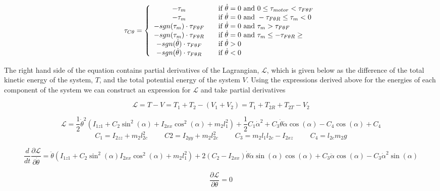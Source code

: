 \documentclass{article}
\theoremstyle{plain}
\theoremstyle{definition}
\theoremstyle{remark}
\newcommand{\Lagr}{\mathcal{L}}
\begin{document}
\[
  \tau_{C \theta} = \left\{
  \begin{array}{c l}
	 - \tau_{m} & \quad \text{if } \dot{\theta} = 0 \text{ and } 0 \leq \tau_{motor} < \tau_{F \theta F} \\
	- \tau_{m} & \quad \text{if } \dot{\theta} = 0 \text{ and } -\tau_{F \theta R} \leq \tau_{m} <  0\\
	- sgn(\tau_{m}) \cdot \tau_{F\theta F}& \quad \text{if } \dot{\theta} = 0 \text{ and } \tau_{m} > \tau_{F \theta F} \\
	- sgn(\tau_{m}) \cdot \tau_{F\theta R} & \quad \text{if } \dot{\theta} = 0 \text{ and } \tau_{m} \leq -\tau_{F \theta R} \geq \\
	- sgn(\dot{\theta}) \cdot \tau_{F \theta F} & \quad \text{if } \dot{\theta} > 0 \\
	- sgn(\dot{\theta}) \cdot \tau_{F \theta R} & \quad \text{if } \dot{\theta} < 0 \\
  \end{array} \right.
\]

The right hand side of the equation contains partial derivatives of the Lagrangian, $\Lagr$, which is given below as the difference of the total kinetic energy of the system, $T$, and the total potential energy of the system $V$.  Using the expressions derived above for the energies of each component of the system we can construct an expression for $\Lagr$ and take partial derivatives 

$$ \Lagr = T - V = T_{1} + T_{2} - \left( V_{1} + V_{2} \right) = T_{1} + T_{2R} + T_{2T} - V_{2}$$

$$ \Lagr = \frac{1}{2} \dot{\theta}^2 \left(I_{1z1} + C_2 \sin^2(\alpha)  + I_{2xx} \cos^2(\alpha) + m_2 l_{1}^2 \right) + \frac{1}{2} C_1  \dot{\alpha}^2 + C_3 \dot{\theta} \dot{\alpha} \cos(\alpha) - C_4 \cos(\alpha) + C_4 $$
$$ C_1 = I_{2zz} + m_2 l_{2c}^2 \hspace{1cm} C2 = I_{2yy} + m_2 l_{2c}^2 \hspace{1cm} C_3 = m_2 l_1 l_{2c} - I_{2xz} \hspace{1cm} C_4 = l_{2c} m_2 g$$

$$\frac{d}{dt} \frac{\partial \Lagr}{\partial \dot{\theta}}  = \ddot{\theta} \left( I_{1z1} + C_2 \sin^2(\alpha) I_{2xx} \cos^2(\alpha) + m_2 l_1^2 \right) + 2 \left( C_2 - I_{2xx}\right)\dot{\theta} \dot{\alpha}  \sin(\alpha) \cos(\alpha) + C_3 \ddot{\alpha} \cos(\alpha) - C_3 \dot{\alpha}^2  \sin(\alpha)$$

$$ \frac{\partial \Lagr}{\partial \theta} = 0 $$
\end{document}
